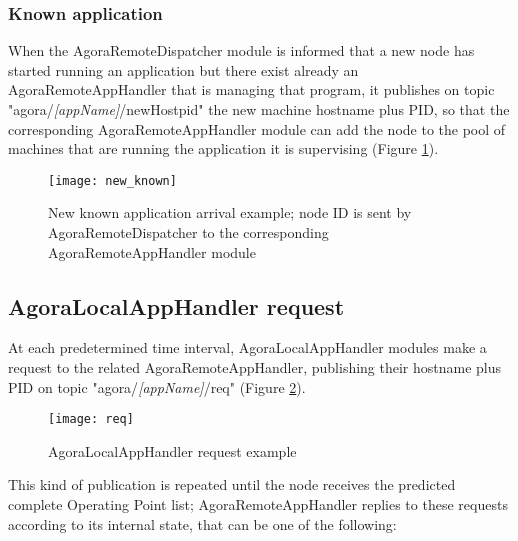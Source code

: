 \subsubsection{Known application}\label{knownApp}

When the AgoraRemoteDispatcher module is informed that a new node has started running an application but there exist already an AgoraRemoteAppHandler that is managing that program, it publishes on topic "agora\slash{}\textit{[app\-Name]}\slash{}newHostpid" the new machine hostname plus PID, so that the corresponding Agora\-Remote\-App\-Handler module can add the node to the pool of machines that are running the application it is supervising (Figure \ref{fig::knownApp}).

\begin{figure}[ht]

    \centering
    \texttt{[image: new\_known]}
    \caption[New known application arrival example]{New known application arrival example; node ID is sent by AgoraRemoteDispatcher to the corresponding AgoraRemoteAppHandler module}

    \label{fig::knownApp}
    
\end{figure}





\subsection{AgoraLocalAppHandler request}\label{clientReq}

At each predetermined time interval, AgoraLocalAppHandler modules make a request to the related AgoraRemoteAppHandler, publishing their hostname plus PID on topic "agora/\textit{[appName]}/req" (Figure \ref{fig::localReq}).

\begin{figure}[hb]

    \centering
    \texttt{[image: req]}
    \caption{AgoraLocalAppHandler request example}

    \label{fig::localReq}
    
\end{figure}

This kind of publication is repeated until the node receives the predicted complete Operating Point list; AgoraRemoteAppHandler replies to these requests according to its internal state, that can be one of the following:

